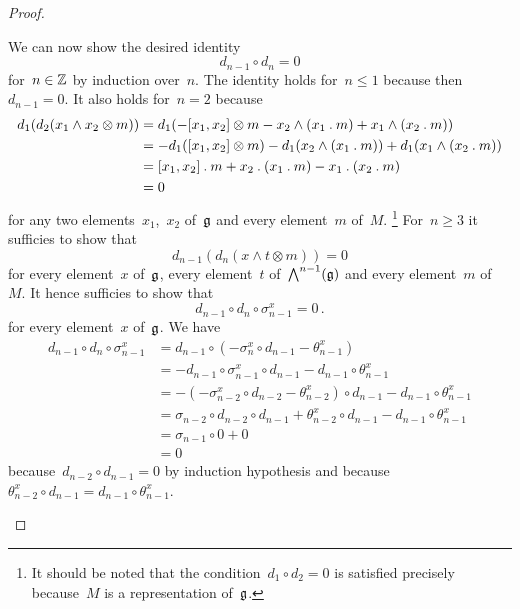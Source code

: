 \begin{proof}
\begin{enumerate}
      We can now show the desired identity
      \[
        d_{n-1} \circ d_n = 0
      \]
      for~$n \in \mathbb{Z}$ by induction over~$n$.
      The identity holds for~$n \leq 1$ because then~$d_{n-1} = 0$.
      It also holds for~$n = 2$ because
      \begin{align*}
        d_1( d_2( x_1 \wedge x_2 \otimes m) )
        &=
        d_1( -[x_1, x_2] \otimes m - x_2 \wedge (x_1 \mathbin{.} m) + x_1 \wedge (x_2 \mathbin{.} m) )
        \\
        &=
        - d_1( [x_1, x_2] \otimes m )
        - d_1( x_2 \wedge (x_1 \mathbin{.} m) )
        + d_1( x_1 \wedge (x_2 \mathbin{.} m) )
        \\
        &=
        [x_1, x_2] \mathbin{.} m
        + x_2 \mathbin{.} (x_1 \mathbin{.} m)
        - x_1 \mathbin{.} (x_2 \mathbin{.} m)
        \\
        &=
        0
      \end{align*}
      for any two elements~$x_1$,~$x_2$ of~$\mathfrak{g}$ and every element~$m$ of~$M$.%
      \footnote{
        It should be noted that the condition~$d_1 \circ d_2 = 0$ is satisfied precisely because~$M$ is a representation of~$\mathfrak{g}$.
      }
      For~$n \geq 3$ it sufficies to show that
      \[
        d_{n-1}( d_n( x \wedge t \otimes m) )
        =
        0
      \]
      for every element~$x$ of~$\mathfrak{g}$, every element~$t$ of~$\operatorname{\bigwedge}^{n-1}(\mathfrak{g})$ and every element~$m$ of~$M$.
      It hence sufficies to show that
      \[
        d_{n-1} \circ d_n \circ \sigma_{n-1}^x = 0 \,.
      \]
      for every element~$x$ of~$\mathfrak{g}$.
      We have
      \begin{align*}
        d_{n-1} \circ d_n \circ \sigma_{n-1}^x
        &=
        d_{n-1} \circ (- \sigma_n^x \circ d_{n-1} - \theta_{n-1}^x)
        \\
        &=
        - d_{n-1} \circ \sigma_{n-1}^x \circ d_{n-1}
        - d_{n-1} \circ \theta_{n-1}^x
        \\
        &=
        - ( - \sigma_{n-2}^x \circ d_{n-2} - \theta_{n-2}^x ) \circ d_{n-1}
        - d_{n-1} \circ \theta_{n-1}^x
        \\
        &=
        \sigma_{n-2} \circ d_{n-2} \circ d_{n-1}
        + \theta_{n-2}^x \circ d_{n-1}
        - d_{n-1} \circ \theta_{n-1}^x
        \\
        &=
        \sigma_{n-1} \circ 0
        + 0
        \\
        &=
        0
      \end{align*}
      because~$d_{n-2} \circ d_{n-1} = 0$ by induction hypothesis and because~$\theta_{n-2}^x \circ d_{n-1} = d_{n-1} \circ \theta_{n-1}^x$.

\end{enumerate}
\end{proof}
